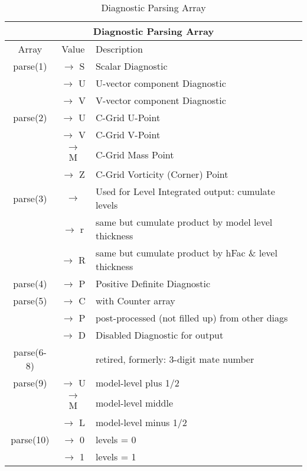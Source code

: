 \begin{table}
\caption{Diagnostic Parsing Array}
\label{tab:diagnostics:gdiag.tabl}
\begin{center}
\begin{tabular}{ |c|c|l| }
\hline
\multicolumn{3}{|c|}{\bf Diagnostic Parsing Array} \\
\hline
\hline
Array & Value & Description \\
\hline
 parse(1)  & $\rightarrow$ S &  Scalar Diagnostic                 \\
           & $\rightarrow$ U &  U-vector component Diagnostic     \\
           & $\rightarrow$ V &  V-vector component Diagnostic     \\ \hline
 parse(2)  & $\rightarrow$ U &  C-Grid U-Point                    \\
           & $\rightarrow$ V &  C-Grid V-Point                    \\
           & $\rightarrow$ M &  C-Grid Mass Point                 \\
           & $\rightarrow$ Z &  C-Grid Vorticity (Corner) Point   \\ \hline
 parse(3)  & $\rightarrow$   &  Used for Level Integrated output: cumulate levels \\
           & $\rightarrow$ r &  same but cumulate product by model level thickness \\
           & $\rightarrow$ R &  same but cumulate product by hFac \& level thickness \\ \hline
 parse(4)  & $\rightarrow$ P &  Positive Definite Diagnostic      \\ \hline
 parse(5)  & $\rightarrow$ C &  with Counter array                \\
           & $\rightarrow$ P &  post-processed (not filled up) from other diags \\
           & $\rightarrow$ D &  Disabled Diagnostic for output    \\ \hline
 parse(6-8)&                 &  retired, formerly: 3-digit mate number \\ \hline
 parse(9)  & $\rightarrow$ U &  model-level plus 1/2  \\
           & $\rightarrow$ M &  model-level middle  \\
           & $\rightarrow$ L &  model-level minus 1/2  \\ \hline
 parse(10) & $\rightarrow$ 0 &  levels = 0  \\
           & $\rightarrow$ 1 &  levels = 1  \\

\end{tabular}
\end{center}
\end{table}

